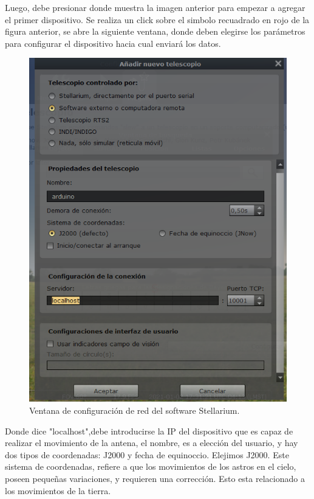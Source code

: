 Luego, debe presionar donde muestra la imagen anterior para empezar a agregar el primer dispositivo. Se realiza un click sobre el simbolo recuadrado en rojo de la figura anterior, se abre la siguiente ventana, donde deben elegirse los parámetros para configurar el dispositivo hacia cual enviará los datos.
\begin{figure}
	\centering
	\includegraphics[scale=0.5]{stellarium-024}
	\caption{Ventana de configuración de red del software Stellarium.}
\end{figure} 
Donde dice "localhost",debe introducirse la IP del dispositivo que es capaz de realizar el movimiento de la antena, el nombre, es a elección del usuario, y hay dos tipos de coordenadas: J2000 y fecha de equinoccio. Elejimos J2000. Este sistema de coordenadas, refiere a que los movimientos de los astros en el cielo, poseen pequeñas variaciones, y requieren una corrección. Esto esta relacionado a los movimientos de la tierra. 

